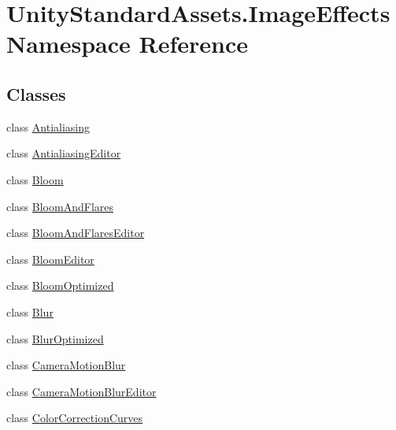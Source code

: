 \hypertarget{namespace_unity_standard_assets_1_1_image_effects}{}\section{Unity\+Standard\+Assets.\+Image\+Effects Namespace Reference}
\label{namespace_unity_standard_assets_1_1_image_effects}
\subsection*{Classes}
\begin{DoxyCompactItemize}
\item 
class \mbox{\hyperlink{class_unity_standard_assets_1_1_image_effects_1_1_antialiasing}{Antialiasing}}
\item 
class \mbox{\hyperlink{class_unity_standard_assets_1_1_image_effects_1_1_antialiasing_editor}{Antialiasing\+Editor}}
\item 
class \mbox{\hyperlink{class_unity_standard_assets_1_1_image_effects_1_1_bloom}{Bloom}}
\item 
class \mbox{\hyperlink{class_unity_standard_assets_1_1_image_effects_1_1_bloom_and_flares}{Bloom\+And\+Flares}}
\item 
class \mbox{\hyperlink{class_unity_standard_assets_1_1_image_effects_1_1_bloom_and_flares_editor}{Bloom\+And\+Flares\+Editor}}
\item 
class \mbox{\hyperlink{class_unity_standard_assets_1_1_image_effects_1_1_bloom_editor}{Bloom\+Editor}}
\item 
class \mbox{\hyperlink{class_unity_standard_assets_1_1_image_effects_1_1_bloom_optimized}{Bloom\+Optimized}}
\item 
class \mbox{\hyperlink{class_unity_standard_assets_1_1_image_effects_1_1_blur}{Blur}}
\item 
class \mbox{\hyperlink{class_unity_standard_assets_1_1_image_effects_1_1_blur_optimized}{Blur\+Optimized}}
\item 
class \mbox{\hyperlink{class_unity_standard_assets_1_1_image_effects_1_1_camera_motion_blur}{Camera\+Motion\+Blur}}
\item 
class \mbox{\hyperlink{class_unity_standard_assets_1_1_image_effects_1_1_camera_motion_blur_editor}{Camera\+Motion\+Blur\+Editor}}
\item 
class \mbox{\hyperlink{class_unity_standard_assets_1_1_image_effects_1_1_color_correction_curves}{Color\+Correction\+Curves}}
\item 

\end{DoxyCompactItemize}
